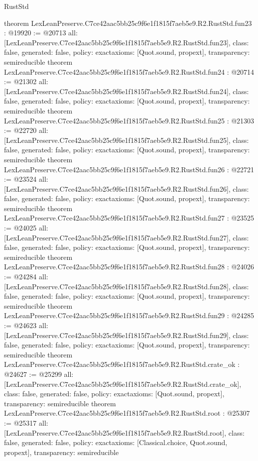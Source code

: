 \begin{lexlean}{RustStd}
\begin{coremodule}
{}
theorem LexLeanPreserve.C7ce42aac5bb25c9f6e1f1815f7aeb5e9.R2.RustStd.fun23 : @19920 := @20713 {
  all: [LexLeanPreserve.C7ce42aac5bb25c9f6e1f1815f7aeb5e9.R2.RustStd.fun23],
  class: false,
  generated: false,
  policy: exact{axioms: [Quot.sound, propext]},
  transparency: semireducible
}
theorem LexLeanPreserve.C7ce42aac5bb25c9f6e1f1815f7aeb5e9.R2.RustStd.fun24 : @20714 := @21302 {
  all: [LexLeanPreserve.C7ce42aac5bb25c9f6e1f1815f7aeb5e9.R2.RustStd.fun24],
  class: false,
  generated: false,
  policy: exact{axioms: [Quot.sound, propext]},
  transparency: semireducible
}
theorem LexLeanPreserve.C7ce42aac5bb25c9f6e1f1815f7aeb5e9.R2.RustStd.fun25 : @21303 := @22720 {
  all: [LexLeanPreserve.C7ce42aac5bb25c9f6e1f1815f7aeb5e9.R2.RustStd.fun25],
  class: false,
  generated: false,
  policy: exact{axioms: [Quot.sound, propext]},
  transparency: semireducible
}
theorem LexLeanPreserve.C7ce42aac5bb25c9f6e1f1815f7aeb5e9.R2.RustStd.fun26 : @22721 := @23524 {
  all: [LexLeanPreserve.C7ce42aac5bb25c9f6e1f1815f7aeb5e9.R2.RustStd.fun26],
  class: false,
  generated: false,
  policy: exact{axioms: [Quot.sound, propext]},
  transparency: semireducible
}
theorem LexLeanPreserve.C7ce42aac5bb25c9f6e1f1815f7aeb5e9.R2.RustStd.fun27 : @23525 := @24025 {
  all: [LexLeanPreserve.C7ce42aac5bb25c9f6e1f1815f7aeb5e9.R2.RustStd.fun27],
  class: false,
  generated: false,
  policy: exact{axioms: [Quot.sound, propext]},
  transparency: semireducible
}
theorem LexLeanPreserve.C7ce42aac5bb25c9f6e1f1815f7aeb5e9.R2.RustStd.fun28 : @24026 := @24284 {
  all: [LexLeanPreserve.C7ce42aac5bb25c9f6e1f1815f7aeb5e9.R2.RustStd.fun28],
  class: false,
  generated: false,
  policy: exact{axioms: [Quot.sound, propext]},
  transparency: semireducible
}
theorem LexLeanPreserve.C7ce42aac5bb25c9f6e1f1815f7aeb5e9.R2.RustStd.fun29 : @24285 := @24623 {
  all: [LexLeanPreserve.C7ce42aac5bb25c9f6e1f1815f7aeb5e9.R2.RustStd.fun29],
  class: false,
  generated: false,
  policy: exact{axioms: [Quot.sound, propext]},
  transparency: semireducible
}
theorem LexLeanPreserve.C7ce42aac5bb25c9f6e1f1815f7aeb5e9.R2.RustStd.crate_ok : @24627 := @25299 {
  all: [LexLeanPreserve.C7ce42aac5bb25c9f6e1f1815f7aeb5e9.R2.RustStd.crate_ok],
  class: false,
  generated: false,
  policy: exact{axioms: [Quot.sound, propext]},
  transparency: semireducible
}
theorem LexLeanPreserve.C7ce42aac5bb25c9f6e1f1815f7aeb5e9.R2.RustStd.root : @25307 := @25317 {
  all: [LexLeanPreserve.C7ce42aac5bb25c9f6e1f1815f7aeb5e9.R2.RustStd.root],
  class: false,
  generated: false,
  policy: exact{axioms: [Classical.choice, Quot.sound, propext]},
  transparency: semireducible
}


\end{coremodule}
\end{lexlean}
